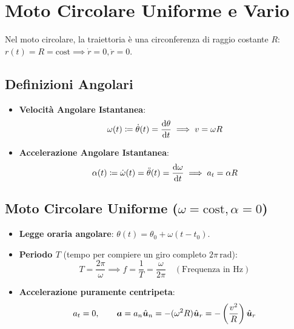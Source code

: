 \section{Moto Circolare Uniforme e Vario}
\label{sec:moto_circolare}

Nel moto circolare, la traiettoria è una circonferenza di raggio costante $R$: $r(t) = R = \text{cost} \implies \dot{r} = 0, \ddot{r} = 0$.

\subsection{Definizioni Angolari}
\begin{itemize}
    \item \textbf{Velocità Angolare Istantanea}:
    \begin{equation}
        \omega(t) \coloneqq \dot{\theta}(t) = \frac{\mathrm{d} \theta}{\mathrm{d} t} \implies v = \omega R
    \end{equation}
    \item \textbf{Accelerazione Angolare Istantanea}:
    \begin{equation}
        \alpha(t) \coloneqq \dot{\omega}(t) = \ddot{\theta}(t) = \frac{\mathrm{d} \omega}{\mathrm{d} t} \implies a_t = \alpha R
    \end{equation}
\end{itemize}

\subsection{Moto Circolare Uniforme ($\omega = \text{cost}, \alpha = 0$)}
\begin{itemize}
    \item \textbf{Legge oraria angolare}: $\theta(t) = \theta_0 + \omega(t - t_0)$.
    \item \textbf{Periodo $T$} (tempo per compiere un giro completo $2\pi\,\si{\radian}$):
    \begin{equation}
        T = \frac{2\pi}{\omega} \implies f = \frac{1}{T} = \frac{\omega}{2\pi} \quad (\text{Frequenza in }\si{\hertz})
    \end{equation}
    \item \textbf{Accelerazione puramente centripeta}:
    \begin{equation}
        a_t = 0, \qquad \bm{a} = a_n \hat{\bm{u}}_n = -(\omega^2 R)\hat{\bm{u}}_r = -\left(\frac{v^2}{R}\right)\hat{\bm{u}}_r
    \end{equation}
\end{itemize}

